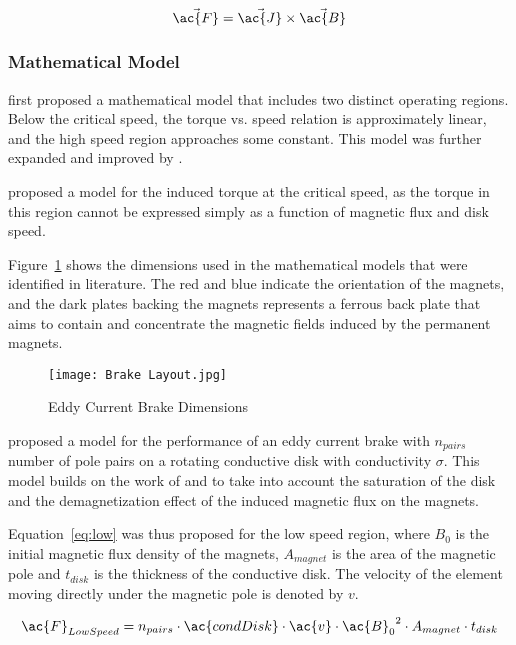 \begin{equation}
	\vec{\ac{F}} = \vec{\ac{J}} \times \vec{\ac{B}}
	\label{eq:force}
\end{equation}

\subsubsection{Mathematical Model}

\citet{Smythe:1942} first proposed a mathematical model that includes two distinct operating regions. Below the critical speed, the torque vs. speed relation is approximately linear, and the high speed region approaches some constant. This model was further expanded and improved by \cite{Smythe:1950}.

\cite{Wouterse:1991} proposed a model for the induced torque at the critical speed, as the torque in this region cannot be expressed simply as a function of magnetic flux and disk speed. 

Figure~\ref{fig:EB} shows the dimensions used in the mathematical models that were identified in literature. The red and blue indicate the orientation of the magnets, and the dark plates backing the magnets represents a ferrous back plate that aims to contain and concentrate the magnetic fields induced by the permanent magnets. \citep{Gay:2005}

\begin{figure}[H]
	\centering
	\texttt{[image: Brake Layout.jpg]}
	\caption{Eddy Current Brake Dimensions}
	\label{fig:EB}
\end{figure}

\vspace*{-0.5cm}

\cite{Baum:2016} proposed a model for the performance of an eddy current brake with $n_{pairs}$ number of pole pairs on a rotating conductive disk with conductivity $\sigma$. This model builds on the work of \cite{Smythe:1950} and \cite{Wouterse:1991} to take into account the saturation of the disk and the demagnetization effect of the induced magnetic flux on the magnets. \citep{Gay:2005}

Equation~\ref{eq:low} was thus proposed for the low speed region, where $B_0$ is the initial magnetic flux density of the magnets, $A_{magnet}$ is the area of the magnetic pole and $t_{disk}$ is the thickness of the conductive disk. The velocity of the element moving directly under the magnetic pole is denoted by $v$.

\begin{equation}
	\ac{F}_{Low Speed} = n_{pairs} \cdot \ac{condDisk} \cdot \ac{v} \cdot {\ac{B}_0}^2 \cdot A_{magnet} \cdot t_{disk}
	\label{eq:low}
\end{equation}

